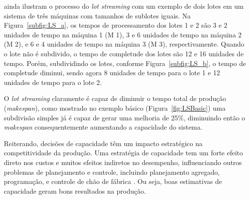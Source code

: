      ainda ilustram o processo do \textit{lot streaming} com um exemplo de dois lotes em um sistema de três máquinas com tamanhos de sublotes iguais. Na Figura~\ref{subfig:LS_a}, os tempos de processamento dos lotes 1 e 2 são 3 e 2 unidades de tempo na máquina 1 (M 1), 3 e 6 unidades de tempo na máquina 2 (M 2), e 6 e 4 unidades de tempo na máquina 3 (M 3), respectivamente. Quando o lote não é subdivido, o tempo de completude dos lotes são 12 e 16 unidades de tempo. Porém, subdividindo os lotes, conforme Figura~\ref{subfig:LS_b}, o tempo de completude diminui, sendo agora 8 unidades de tempo para o lote 1 e 12 unidades de tempo para o lote 2.
    
        
    
    O \textit{lot streaming} claramente é capaz de diminuir o tempo total de produção (\textit{makespan}), como mostrado no exemplo básico (Figura~\ref{fig:LSBasic}) uma subdivisão simples já é capaz de gerar uma melhoria de 25\%, diminuindo então o \textit{makespan} consequentemente aumentando a capacidade do sistema.
    
    Reiterando, decisões de capacidade têm um impacto estratégico na competitividade da produção. Uma estratégia de capacidade tem um forte efeito direto nos custos e muitos efeitos indiretos no desempenho, influenciando outros problemas de planejamento e controle, incluindo planejamento agregado, programação, e controle de chão de fábrica \cite{Hopp2001}. Ou seja, boas estimativas de capacidade geram bons resultados na produção. 
    
    
    